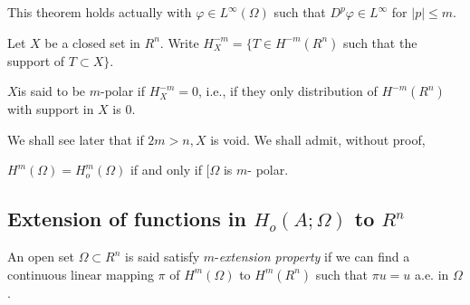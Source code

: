 This theorem holds actually with $\varphi \in L^ \infty
(\Omega)$ such that $D^p \varphi \in L^\infty$ for $|p|\le
m$. 

Let $X$ be a closed set in $R^n$. Write $H^{-m}_X= \{ T \in
H^{-m}(R^n)$ such that the support of $T \subset X \}$. 

\begin{definition}\label{lec3:sec2:subsec1:def2.2}%
  $X$\pageoriginale is said to be $m$-polar if $H^{-m}_X=0$, i.e., if they only
  distribution of $H^{-m}(R^n)$ with support in $X$ is $0$.  
\end{definition}

We shall see later that if $2m > n, X$ is void. We shall admit, without proof,
\begin{theorem}\label{lec3:sec2:subsec1:thm2.2}%
  $H^m(\Omega)= H^m_o(\Omega)$ if and only if $[ \Omega$ is $m$- polar.
\end{theorem}

\subsection{Extension of functions in \texorpdfstring{$H_o(A; \Omega)$}{H0(A;Omega)} to \texorpdfstring{$R^n$}{Rn}}
\label{lec3:sec2:subsec2}  

\begin{definition}\label{lec3:sec2:subsec2:def2.3}%
  An open set $\Omega \subset R^n$ is said satisfy $m$-{\em extension
    property} if we can find a continuous linear mapping $\pi$ of $H^m
  (\Omega)$ to $H^m(R^n)$ such that $\pi u =u$ a.e. in $\Omega$. 
\end{definition}

